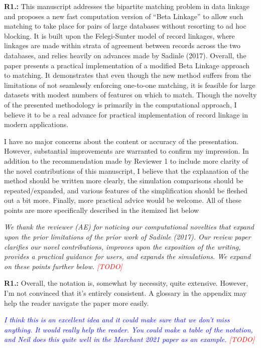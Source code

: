\documentclass[letterpaper, parskip]{scrartcl}
\newcommand{\pointRaised}[2]{%
	\textbf{#1.\theresponsectr:} #2
}
\newcounter{responsectr}[section]     %
\newcommand{\reply}[1]{%
	\refstepcounter{responsectr}%
		\begin{tcolorbox}
			\itshape #1
		\end{tcolorbox}
}
\newcommand{\todo}{\textcolor{red}{[TODO]}\xspace}
\begin{document}
	\pointRaised{R1}{%
	This manuscript addresses the bipartite matching problem in data linkage and proposes a new fast computation version of “Beta Linkage” to allow such matching to take place for pairs of large databases without resorting to ad hoc blocking. It is built upon the Felegi-Sunter model of record linkages, where linkages are made within strata of agreement between records across the two databases, and relies heavily on advances made by Sadinle (2017). Overall, the paper presents a practical implementation of a modified Beta Linkage approach to	matching. It demonstrates that even though the new method suffers from the limitations of not seamlessly enforcing one-to-one matching, it is feasible for large datasets with modest numbers of features on which to match. Though the novelty of the presented methodology is primarily in the computational approach, I believe it to be a real advance for practical implementation of record linkage in modern applications.
	
	I have no major concerns about the content or accuracy of the presentation. However, substantial improvements are warranted to confirm my impression. In addition to the recommendation made by Reviewer 1 to include more clarity of the novel contributions of this manuscript, I believe that the explanation of the method should be written more clearly, the simulation comparisons should be repeated/expanded, and various features of the simplification should be fleshed out a bit more. Finally, more practical advice would be welcome. All of these points are more specifically described in the itemized list below
	}

	\reply{%
	We thank the reviewer (AE) for noticing our computational novelties that expand upon the prior limitations of the prior work of Sadinle (2017). Our review paper clarifies our novel contributions, improves upon the exposition of the writing, provides a practical guidance for users, and expands the simulations. We expand on these points further below. \todo
	}


	\pointRaised{R1}{%
		Overall, the notation is, somewhat by necessity, quite extensive. However, I’m not convinced that it’s entirely consistent. A glossary in the appendix may help the reader navigate the paper more easily.}
\reply{%
	\textcolor{blue}{I think this is an excellent idea and it could make sure that we don't miss anything. It would really help the reader. You could make a table of the notation, and Neil does this quite well in the Marchant 2021 paper as an example.} \todo
}
\end{document}
